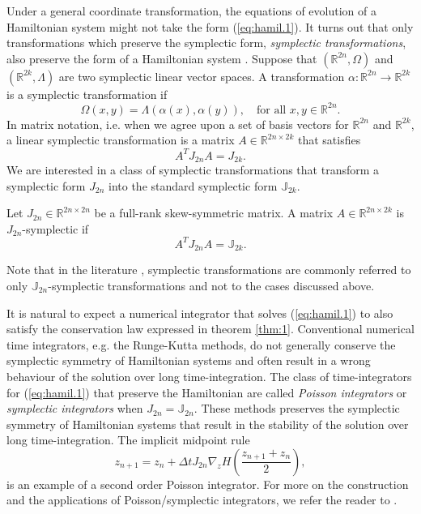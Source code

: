 Under a general coordinate transformation, the equations of evolution of a Hamiltonian system might not take the form (\ref{eq:hamil.1}). It turns out that only transformations which preserve the symplectic form, \emph{symplectic transformations}, also preserve the form of a Hamiltonian system \cite{Hairer:1250576}. Suppose that $(\mathbb R^{2n},\Omega)$ and $(\mathbb R^{2k},\Lambda)$ are two symplectic linear vector spaces. A transformation $\alpha:\mathbb R^{2n}\to\mathbb R^{2k}$ is a symplectic transformation if
\begin{equation}
	\Omega(x,y) = \Lambda(\alpha(x),\alpha(y)), \quad \text{for all } x,y\in\mathbb R^{2n}.
\end{equation}
In matrix notation, i.e. when we agree upon a set of basis vectors for $\mathbb R^{2n}$ and $\mathbb R^{2k}$, a linear symplectic transformation is a matrix $A\in \mathbb R^{2n\times 2k}$ that satisfies
\begin{equation}
	A^T J_{2n} A = J_{2k}.
\end{equation}
We are interested in a class of symplectic transformations that transform a symplectic form $J_{2n}$ into the standard symplectic form $\mathbb J_{2k}$.
\begin{definition}
Let $J_{2n}\in \mathbb R^{2n\times 2n}$ be a full-rank skew-symmetric matrix. A matrix $A\in\mathbb R^{2n\times 2k}$ is $J_{2n}$-symplectic if
\begin{equation}
A^T J_{2n} A = \mathbb{J}_{2k}.
\end{equation}
\end{definition}
Note that in the literature \cite{Marsden:2010:IMS:1965128,Hairer:1250576}, symplectic transformations are commonly referred to only $\mathbb J_{2n}$-symplectic transformations and not to the cases discussed above.

It is natural to expect a numerical integrator that solves (\ref{eq:hamil.1}) to also satisfy the conservation law expressed in theorem \ref{thm:1}. Conventional numerical time integrators, e.g. the Runge-Kutta methods, do not generally conserve the symplectic symmetry of Hamiltonian systems and often result in a wrong behaviour of the solution over long time-integration. The class of time-integrators for (\ref{eq:hamil.1}) that preserve the Hamiltonian are called \emph{Poisson integrators} or \emph{symplectic integrators} when $J_{2n} = \mathbb J_{2n}$. These methods preserves the symplectic symmetry of Hamiltonian systems that result in the stability of the solution over long time-integration. The implicit midpoint rule
\begin{equation}
	z_{n+1} = z_{n} + \Delta t J_{2n} \nabla_z H( \frac{z_{n+1} + z_n}{2} ),
\end{equation}
is an example of a second order Poisson integrator. For more on the construction and the applications of Poisson/symplectic integrators, we refer the reader to \cite{Hairer:1250576}. 

